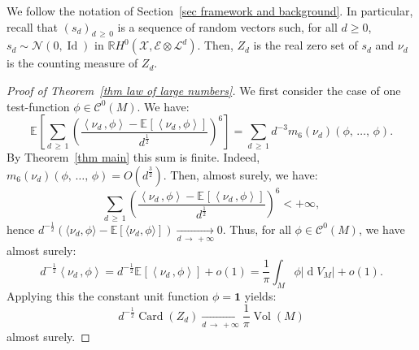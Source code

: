 \documentclass[10pt]{amsart}
\theoremstyle{definition}\newtheorem{defi}[theo]{Definition}\newtheorem{rema}[theo]{Remark}\newtheorem{exam}[theo]{Example}\newtheorem{exem}[theo]{Example}\newtheorem{nota}[theo]{Notation}
\DeclareMathOperator{\card}{Card}
\DeclareMathOperator{\dmesure}{d}
\DeclareMathOperator{\Id}{Id}
\DeclareMathOperator{\Vol}{Vol}
\newcommand{\E}{\mathcal{E}}
\newcommand{\X}{\mathcal{X}}
\renewcommand{\L}{\mathcal{L}}
\newcommand{\clN}{\mathcal{N}}
\newcommand{\clC}{\mathcal{C}}
\newcommand{\R}{\mathbb{R}}
\newcommand{\bbE}{\mathbb{E}}
\newcommand{\bfun}{\mathbf{1}}
\newcommand{\esp}[2][]{\mathbb{E}_{#1}\!\left[#2 \right]}
\newcommand{\norm}[1]{\left\lvert #1 \right\rvert}
\newcommand{\prsc}[2]{\left\langle #1\,, #2 \right\rangle}
\newcommand{\rmes}[1]{\norm{\dmesure\! V_{#1}}}
\newcommand{\vol}[1]{\Vol\!\left(#1\right)}
\renewcommand{\H}{H^0(\X,\E \otimes \L^d)}
\renewcommand{\geq}{\geqslant}
\begin{document}
We follow the notation of Section~\ref{sec framework and background}. In particular, recall that $(s_d)_{d\,\geq\,0}$ is a sequence of random vectors such, for all $d \geq 0$, $s_d \sim \clN(0,\Id)$ in $\R\H$. Then, $Z_d$ is the real zero set of $s_d$ and $\nu_d$ is the counting measure of $Z_d$.

\begin{proof}[Proof of Theorem~\ref{thm law of large numbers}]
We first consider the case of one test-function $\phi \in \clC^0(M)$. We have:
\[
\esp{\sum_{d\,\geq\,1} \left(\frac{\prsc{\nu_d}{\phi} - \esp{\prsc{\nu_d}{\phi}}}{d^\frac{1}{2}}\right)^6} = \sum_{d \,\geq\,1} d^{-3} m_6(\nu_d)(\phi,\,\dots,\,\phi).
\]
By Theorem~\ref{thm main} this sum is finite. Indeed, $m_6(\nu_d)(\phi,\,\dots,\,\phi) = O(d^\frac{3}{2})$. Then, almost surely, we have:
\[
\sum_{d\,\geq\,1} \left(\frac{\prsc{\nu_d}{\phi} - \esp{\prsc{\nu_d}{\phi}}}{d^\frac{1}{2}}\right)^6 < +\infty,
\]
hence $d^{-\frac{1}{2}}(\langle\nu_d, \phi\rangle -  \bbE[\langle\nu_d,\phi\rangle]) \xrightarrow[d\,\to\,+\infty]{} 0$. Thus, for all $\phi \in \clC^0(M)$, we have almost surely:
\[
d^{-\frac{1}{2}} \prsc{\nu_d}{\phi} = d^{-\frac{1}{2}} \esp{\prsc{\nu_d}{\phi}} + o(1) = \frac{1}{\pi} \int_M \phi \rmes{M} + o(1).
\]
Applying this the constant unit function $\phi=\bfun$ yields: \[
d^{-\frac{1}{2}}\card(Z_d) \xrightarrow[d\,\to\,+\infty]{} \frac{1}{\pi}\vol{M}
\]
almost surely.


\end{proof}
\end{document}
